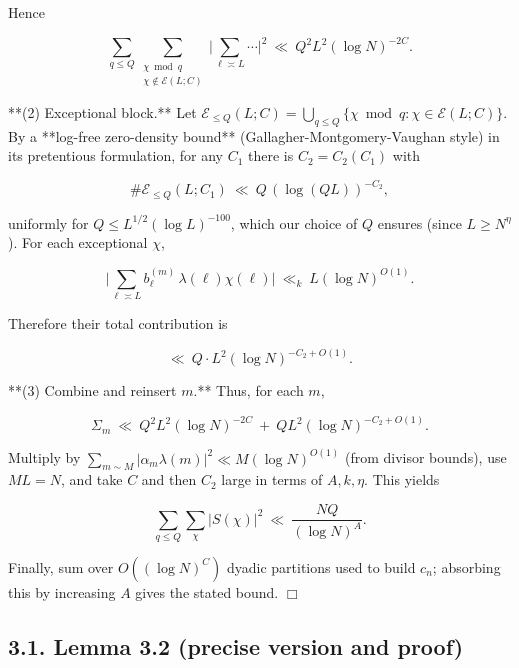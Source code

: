 \documentclass[11pt]{article}
\theoremstyle{definition}
\theoremstyle{remark}
\begin{document}
Hence

$$
\sum_{q\le Q}\sum_{\substack{\chi\bmod q\\ \chi\notin\mathcal E(L;C)}}
\Big|\sum_{\ell\asymp L}\cdots\Big|^2\ \ll\ Q^2 L^2 (\log N)^{-2C}.
$$

**(2) Exceptional block.**
Let $\mathcal E_{\le Q}(L;C)=\bigcup_{q\le Q}\{\chi\bmod q:\chi\in\mathcal E(L;C)\}$. By a **log-free zero-density bound** (Gallagher-Montgomery-Vaughan style) in its pretentious formulation, for any $C_1$ there is $C_2=C_2(C_1)$ with

$$
\#\mathcal E_{\le Q}(L;C_1)\ \ll\ Q\,(\log (QL))^{-C_2},
$$

uniformly for $Q\le L^{1/2}(\log L)^{-100}$, which our choice of $Q$ ensures (since $L\ge N^{\eta}$). For each exceptional $\chi$,

$$
\Big|\sum_{\ell\asymp L} b^{(m)}_\ell\,\lambda(\ell)\chi(\ell)\Big|
\ \ll_k\ L(\log N)^{O(1)}.
$$

Therefore their total contribution is

$$
\ll\ Q\cdot L^2 (\log N)^{-C_2+O(1)}.
$$

**(3) Combine and reinsert $m$.**
Thus, for each $m$,

$$
\Sigma_m\ \ll\ Q^2 L^2 (\log N)^{-2C} \ +\ Q L^2 (\log N)^{-C_2+O(1)}.
$$

Multiply by $\sum_{m\sim M}|\alpha_m\lambda(m)|^2\ll M(\log N)^{O(1)}$ (from divisor bounds), use $ML=N$, and take $C$ and then $C_2$ large in terms of $A,k,\eta$. This yields

$$
\sum_{q\le Q}\sum_{\chi}|S(\chi)|^2\ \ll\ \frac{NQ}{(\log N)^A}.
$$

Finally, sum over $O((\log N)^C)$ dyadic partitions used to build $c_n$; absorbing this by increasing $A$ gives the stated bound. $\Box$

\subsection*{3.1. Lemma 3.2 (precise version and proof)}
\end{document}
